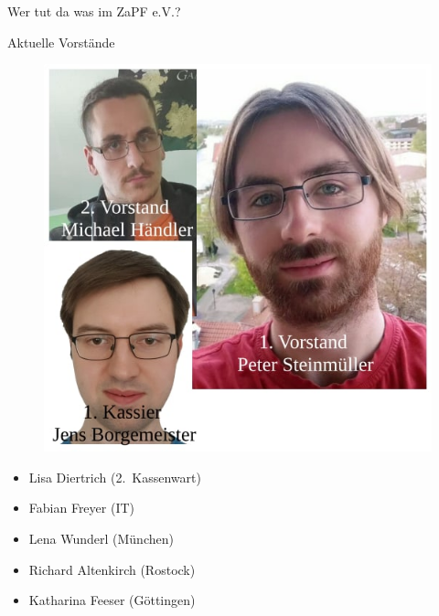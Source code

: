 \documentclass[compress, aspectratio=169]{beamer}
\begin{document}
 \begin{frame}{Wer tut da was im ZaPF e.V.?}
   \begin{block}{Aktuelle Vorstände}
     \begin{minipage}{0.5\textwidth}
       \begin{figure}
       \includegraphics[height=.75\textheight]{zapfev.jpg}
       \end{figure}
     \end{minipage}
     \begin{minipage}{0.45\textwidth}
       \begin{itemize}
         \item Lisa Diertrich \mbox{(2. Kassenwart)}
         \item Fabian Freyer (IT)
         \item Lena Wunderl (München)
         \item Richard Altenkirch (Rostock)
         \item Katharina Feeser (Göttingen)
       \end{itemize}
     \end{minipage}
   \end{block}
 \end{frame}
   
\end{document}
